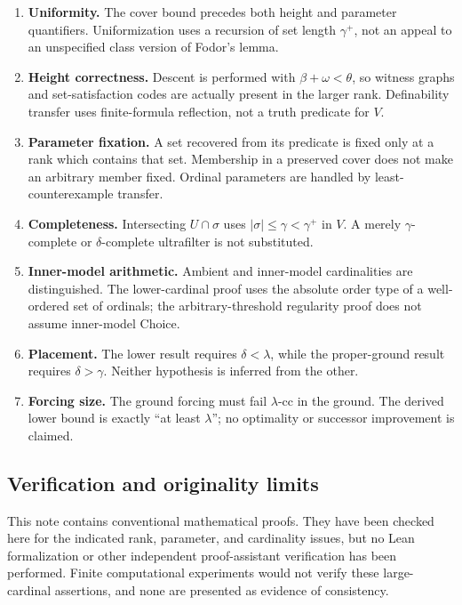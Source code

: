 \documentclass[11pt,letterpaper]{article}
\theoremstyle{definition}
\begin{document}
\begin{enumerate}
\item \textbf{Uniformity.} The cover bound precedes both height and parameter quantifiers. Uniformization uses a recursion of set length $\gamma^+$, not an appeal to an unspecified class version of Fodor's lemma.
\item \textbf{Height correctness.} Descent is performed with $\beta+\omega<\theta$, so witness graphs and set-satisfaction codes are actually present in the larger rank. Definability transfer uses finite-formula reflection, not a truth predicate for $V$.
\item \textbf{Parameter fixation.} A set recovered from its predicate is fixed only at a rank which contains that set. Membership in a preserved cover does not make an arbitrary member fixed. Ordinal parameters are handled by least-counterexample transfer.
\item \textbf{Completeness.} Intersecting $U\cap\sigma$ uses $|\sigma|\le\gamma<\gamma^+$ in $V$. A merely $\gamma$-complete or $\delta$-complete ultrafilter is not substituted.
\item \textbf{Inner-model arithmetic.} Ambient and inner-model cardinalities are distinguished. The lower-cardinal proof uses the absolute order type of a well-ordered set of ordinals; the arbitrary-threshold regularity proof does not assume inner-model Choice.
\item \textbf{Placement.} The lower result requires $\delta<\lambda$, while the proper-ground result requires $\delta>\gamma$. Neither hypothesis is inferred from the other.
\item \textbf{Forcing size.} The ground forcing must fail $\lambda$-cc in the ground. The derived lower bound is exactly ``at least $\lambda$''; no optimality or successor improvement is claimed.
\end{enumerate}

\subsection{Verification and originality limits}

This note contains conventional mathematical proofs. They have been checked here for the indicated rank, parameter, and cardinality issues, but no Lean formalization or other independent proof-assistant verification has been performed. Finite computational experiments would not verify these large-cardinal assertions, and none are presented as evidence of consistency.
\end{document}

